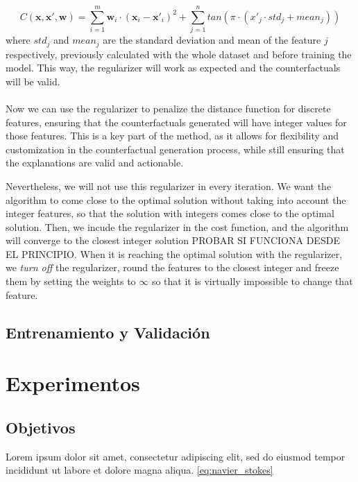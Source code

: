 \documentclass[12pt]{extarticle}
\numberwithin{equation}{section}
\begin{document}
\begin{equation}\label{eq:cost_reg_scaled}
    C(\mathbf{x}, \mathbf{x}', \mathbf{w}) = \sum_{i=1}^{m} \mathbf{w}_i \cdot (\mathbf{x}_i - \mathbf{x}'_{i})^2 + \sum_{j=1}^{n} tan(\pi \cdot (x'_j \cdot std_j + mean_j))
\end{equation}
where \(std_j\) and \(mean_j\) are the standard deviation and mean of the feature \(j\) respectively, previously calculated with the whole dataset and before training the model. This way, the regularizer will work as expected and the counterfactuals will be valid.\\
\\
Now we can use the regularizer to penalize the distance function for discrete features, ensuring that the counterfactuals generated will have integer values for those features. This is a key part of the method, as it allows for flexibility and customization in the counterfactual generation process, while still ensuring that the explanations are valid and actionable. 

Nevertheless, we will not use this regularizer in every iteration. We want the algorithm to come close to the optimal solution without taking into account the integer features, so that the solution with integers comes close to the optimal solution. Then, we incude the regularizer in the cost function, and the algorithm will converge to the closest integer solution PROBAR SI FUNCIONA DESDE EL PRINCIPIO. When it is reaching the optimal solution with the regularizer, we \emph{turn off} the regularizer, round the features to the closest integer and freeze them by setting the weights to $\infty$ so that it is virtually impossible to change that feature.

\subsection{Entrenamiento y Validación}

\section{Experimentos}
\subsection{Objetivos}
Lorem ipsum dolor sit amet, consectetur adipiscing elit, sed do eiusmod tempor incididunt ut labore et dolore magna aliqua. \autoref{eq:navier_stokes} %
\end{document}
